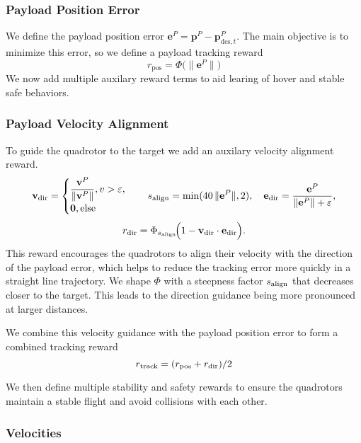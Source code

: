 \subsubsection{Payload Position Error}
We define the payload position error \(\mathbf{e}^P = \mathbf{p}^P - \mathbf{p}^P_{\mathrm{des},t}\). The main objective is to minimize this error, so we define a payload tracking reward
\begin{equation}
r_{\mathrm{pos}} = \Phi\bigl(\|\mathbf{e}^P\|\bigr)
\end{equation}
We now add multiple auxilary reward terms to aid learing of hover and stable safe behaviors.
\subsubsection{Payload Velocity Alignment}
To guide the quadrotor to the target we add an auxilary velocity alignment reward.
\begin{equation}
\mathbf{v}_{\rm dir} =
\begin{cases}
\dfrac{\mathbf{v}^P}{\lVert \mathbf{v}^P\rVert},  v > \varepsilon,\\[4pt]
\mathbf{0},  \text{else}
\end{cases}
\quad
s_{\rm align} = \min(40\,\|\mathbf{e}^P\|,2), \quad
\mathbf{e}_{\rm dir} = \dfrac{\mathbf{e}^P}{\|\mathbf{e}^P\| + \varepsilon},
\end{equation}
\begin{equation}
r_{\rm dir} = \Phi_{s_{\rm align}}\!\Bigl(1 - \mathbf{v}_{\rm dir}\cdot\mathbf{e}_{\rm dir}\Bigr).
\end{equation}
This reward encourages the quadrotors to align their velocity with the direction of the payload error, which helps to reduce the tracking error more quickly in a straight line trajectory. We shape $\Phi$ with a steepness factor $s_{\rm align}$ that decreases closer to the target. This leads to the direction guidance being more pronounced at larger distances.

We combine this velocity guidance with the payload position error to form a combined tracking reward
\begin{equation}
r_{\mathrm{track}} =(r_{\mathrm{pos}} + r_{\rm dir})/2
\end{equation}

We then define multiple stability and safety rewards to ensure the quadrotors maintain a stable flight and avoid collisions with each other.

\subsubsection{Velocities}

